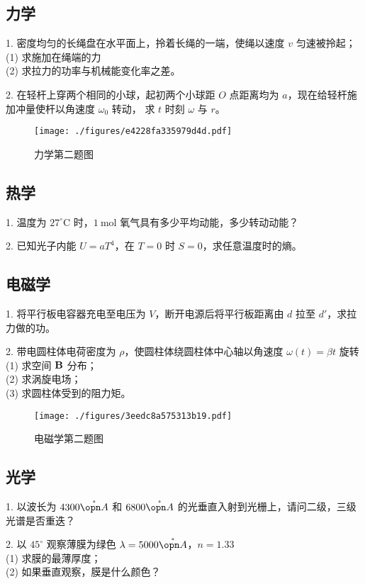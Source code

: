 \subsection{力学}
1. 密度均匀的长绳盘在水平面上，拎着长绳的一端，使绳以速度 $v$ 匀速被拎起；\\
(1) 求施加在绳端的力\\
(2) 求拉力的功率与机械能变化率之差。

2. 在轻杆上穿两个相同的小球，起初两个小球距 $O$ 点距离均为 $a$，现在给轻杆施加冲量使杆以角速度 $\omega_{0}$ 转动， 求 $t$ 时刻 $\omega$ 与 $r$。
\begin{figure}[ht]
\centering
\texttt{[image: ./figures/e4228fa335979d4d.pdf]}
\caption{力学第二题图} \label{fig_NJU15_1}
\end{figure}
\subsection{热学}
1. 温度为 $27^{\circ} \mathrm{C}$ 时，$1 \mathrm{~mol}$ 氧气具有多少平均动能，多少转动动能？

2. 已知光子内能 $U=a T^{4}$，在 $T=0$ 时 $S=0$，求任意温度时的熵。
\subsection{电磁学}
1. 将平行板电容器充电至电压为 $V$，断开电源后将平行板距离由 $d$ 拉至 $d'$，求拉力做的功。

2. 带电圆柱体电荷密度为 $\rho$，使圆柱体绕圆柱体中心轴以角速度 $\omega(t)=\beta t$ 旋转\\
(1) 求空间 $\bf{B}$ 分布；\\
(2) 求涡旋电场；\\
(3) 求圆柱体受到的阻力矩。
\begin{figure}[ht]
\centering
\texttt{[image: ./figures/3eedc8a575313b19.pdf]}
\caption{电磁学第二题图} \label{fig_NJU15_2}
\end{figure}
\subsection{光学}
1. 以波长为 $4300 \mathring{\opn A}$ 和 $6800 \mathring{\opn A}$ 的光垂直入射到光栅上，请问二级，三级光谱是否重迭？

2. 以 $45^{\circ}$ 观察薄膜为绿色 $\lambda=5000 \mathring{\opn A}$，$n=1.33$\\
(1) 求膜的最薄厚度；\\
(2) 如果垂直观察，膜是什么颜色？